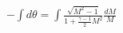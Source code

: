 \documentclass[10pt]{article}
\begin{document}
\begin{align*}- \int d \theta
=
\int \frac{ \sqrt{M^2-1} }{1 + \frac{\gamma-1}{2} M^2 } \frac{dM}{M}
\end{align*}
\end{document}
